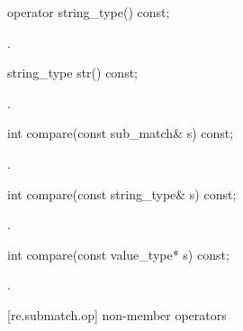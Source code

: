 %
%
\begin{itemdecl}
operator string_type() const;
\end{itemdecl}

\begin{itemdescr}
\pnum\returns {}.
\end{itemdescr}

%
%
\begin{itemdecl}
string_type str() const;
\end{itemdecl}

\begin{itemdescr}
\pnum\returns  {}.
\end{itemdescr}

%
%
\begin{itemdecl}
int compare(const sub_match& s) const;
\end{itemdecl}

\begin{itemdescr}
\pnum\returns  {}.
\end{itemdescr}

%
%
\begin{itemdecl}
int compare(const string_type& s) const;
\end{itemdecl}

\begin{itemdescr}
\pnum\returns  {}.
\end{itemdescr}

%
%
\begin{itemdecl}
int compare(const value_type* s) const;
\end{itemdecl}

\begin{itemdescr}
\pnum\returns  {}.
\end{itemdescr}

[re.submatch.op]{ non-member operators}

